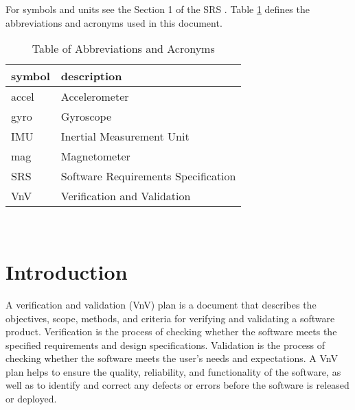 \documentclass[12pt, titlepage]{article}
\begin{document}
For symbols and units see the Section 1 of the SRS \citep{SRS}. Table \ref{tab:abb} defines the
abbreviations and acronyms used in this document.


\begin{table}[!h]
  \centering
  \caption{Table of Abbreviations and Acronyms}
\renewcommand{\arraystretch}{1.2}
\begin{tabular}{l l} 
    \toprule
    \textbf{symbol} & \textbf{description}\\
    \midrule 
    accel & Accelerometer \\
    gyro & Gyroscope \\
    IMU & Inertial Measurement Unit\\
    mag & Magnetometer \\
    SRS & Software Requirements Specification\\
    VnV & Verification and Validation \\
    \bottomrule
\end{tabular}\\
\label{tab:abb}
\end{table}



\newpage


\section{Introduction}

A verification and validation (VnV) plan is a document that describes the objectives, scope,
methods, and criteria for verifying and validating a software product. Verification is the process
of checking whether the software meets the specified requirements and design specifications.
Validation is the process of checking whether the software meets the user's needs and expectations.
A VnV plan helps to ensure the quality, reliability, and functionality of the software, as well as
to identify and correct any defects or errors before the software is released or deployed.
\end{document}

